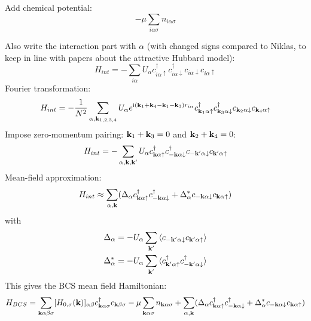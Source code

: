 \documentclass[../main.tex]{subfiles}
\begin{document}
Add chemical potential:
\begin{equation}
    -\mu \sum_{i \alpha \sigma} n_{i \alpha \sigma}
\end{equation}

Also write the interaction part with \(\alpha\) (with changed signs compared to Niklas, to keep in line with papers about the attractive Hubbard model):
\begin{equation}
    H_{int} = - \sum_{i \alpha} U_{\alpha} c_{i\alpha \uparrow}^{\dagger} c_{i\alpha \downarrow}^{\dagger} c_{i\alpha \downarrow} c_{i\alpha \uparrow}
\end{equation}
Fourier transformation:
\begin{equation}
    H_{int} = - \frac{1}{N^2} \sum_{\alpha, \bm{\mathrm{k}}_{1, 2, 3, 4}} U_{\alpha} e^{\mathrm{i} (\bm{\mathrm{k}}_1 + \bm{\mathrm{k}}_4 - \bm{\mathrm{k}}_1 - \bm{\mathrm{k}}_3) r_{i \alpha}}  c_{\bm{\mathrm{k}}_1 \alpha \uparrow}^{\dagger} c_{\bm{\mathrm{k}}_3 \alpha \downarrow}^{\dagger} c_{\bm{\mathrm{k}}_2 \alpha \downarrow} c_{\bm{\mathrm{k}}_4 \alpha \uparrow}
\end{equation}
Impose zero-momentum pairing: \(\bm{\mathrm{k}}_1 + \bm{\mathrm{k}}_3 = 0\) and \(\bm{\mathrm{k}}_2 + \bm{\mathrm{k}}_4 = 0\):
\begin{align}
    H_{int} = - \sum_{\alpha, \bm{\mathrm{k}}, \bm{\mathrm{k}}^{\prime}} U_{\alpha} c_{\bm{\mathrm{k}} \alpha \uparrow}^{\dagger} c_{-\bm{\mathrm{k}} \alpha \downarrow}^{\dagger} c_{-\bm{\mathrm{k}}^{\prime} \alpha \downarrow} c_{\bm{\mathrm{k}}^{\prime} \alpha \uparrow}
\end{align}
Mean-field approximation:
\begin{align}
    H_{int} \approx \sum_{\alpha, \bm{\mathrm{k}}} (\Delta_{\alpha} c_{\bm{\mathrm{k}} \alpha \uparrow}^{\dagger} c_{-\bm{\mathrm{k}} \alpha \downarrow}^{\dagger} + \Delta_{\alpha}^* c_{-\bm{\mathrm{k}} \alpha \downarrow} c_{\bm{\mathrm{k}} \alpha \uparrow})
\end{align}
with
\begin{align}
    \Delta_{\alpha} &= - U_{\alpha} \sum_{\bm{\mathrm{k}}^{\prime}} \braket{c_{-\bm{\mathrm{k}}^{\prime} \alpha \downarrow} c_{\bm{\mathrm{k}}^{\prime} \alpha \uparrow}} \\
    \Delta_{\alpha}^* &= - U_{\alpha} \sum_{\bm{\mathrm{k}}^{\prime}} \braket{c_{\bm{\mathrm{k}}^{\prime} \alpha \uparrow}^{\dagger} c_{-\bm{\mathrm{k}}^{\prime} \alpha \downarrow}^{\dagger}}
\end{align}
This gives the BCS mean field Hamiltonian:
\begin{align}
    H_{BCS} = \sum_{\bm{\mathrm{k}} \alpha \beta \sigma} [H_{0, \sigma} (\bm{\mathrm{k}})]_{\alpha \beta} c_{\bm{\mathrm{k}} \alpha \sigma}^{\dagger} c_{\bm{\mathrm{k}} \beta \sigma}
    -\mu \sum_{\bm{\mathrm{k}} \alpha \sigma} n_{\bm{\mathrm{k}} \alpha \sigma}
    + \sum_{\alpha, \bm{\mathrm{k}}} (\Delta_{\alpha} c_{\bm{\mathrm{k}} \alpha \uparrow}^{\dagger} c_{-\bm{\mathrm{k}} \alpha \downarrow}^{\dagger} + \Delta_{\alpha}^* c_{-\bm{\mathrm{k}} \alpha \downarrow} c_{\bm{\mathrm{k}} \alpha \uparrow})
\end{align}
\end{document}
